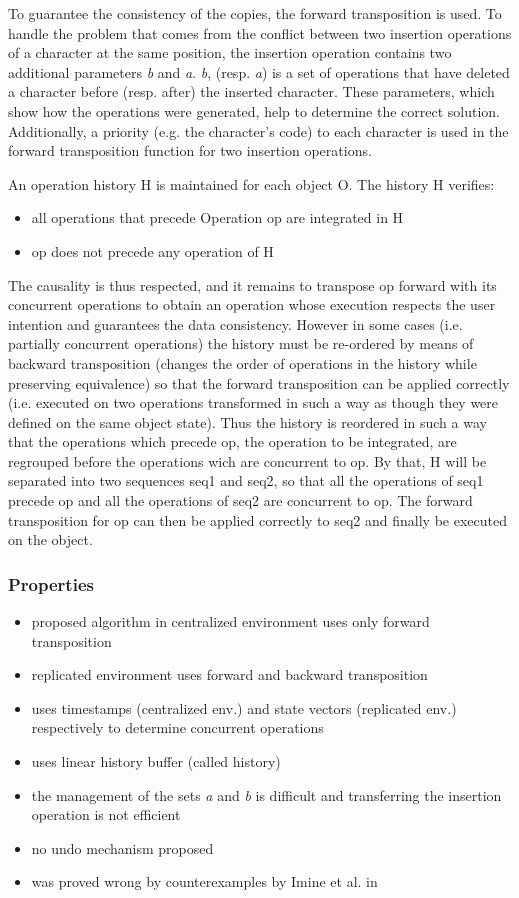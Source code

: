 To guarantee the consistency of the copies, the forward transposition is used. To handle the problem that comes from the conflict between two insertion operations of a character at the same position, the insertion operation contains two additional parameters \emph{b} and \emph{a}. \emph{b}, (resp. \emph{a}) is a set of operations that have deleted a character before (resp. after) the inserted character. These parameters, which show how the operations were generated, help to determine the correct solution. Additionally, a priority (e.g. the character's code) to each character is used in the forward transposition function for two insertion operations.

An operation history H is maintained for each object O. The history H verifies:
\begin{itemize}
 \item all operations that precede Operation op are integrated in H
 \item op does not precede any operation of H
\end{itemize}
The causality is thus respected, and it remains to transpose op forward with its concurrent operations to obtain an operation whose execution respects the user intention and guarantees the data consistency. However in some cases (i.e. partially concurrent operations) the history must be re-ordered by means of backward transposition (changes the order of operations in the history while preserving equivalence) so that the forward transposition can be applied correctly (i.e. executed on two operations transformed in such a way as though they were defined on the same object state). Thus the history is reordered in such a way that the operations which precede op, the operation to be integrated, are regrouped before the operations wich are concurrent to op. By that, H will be separated into two sequences seq1 and seq2, so that all the operations of seq1 precede op and all the operations of seq2 are concurrent to op. The forward transposition for op can then be applied correctly to seq2 and finally be executed on the object.

\subsubsection{Properties}
\begin{itemize}
 \item proposed algorithm in centralized environment uses only forward transposition
 \item replicated environment uses forward and backward transposition
 \item uses timestamps (centralized env.) and state vectors (replicated env.) respectively to determine concurrent operations
 \item uses linear history buffer (called history) 
 \item the management of the sets \emph{a} and \emph{b} is difficult and transferring the insertion operation is not efficient
 \item no undo mechanism proposed
 \item was proved wrong by counterexamples by Imine et al. in \cite{imine04}
\end{itemize}
 